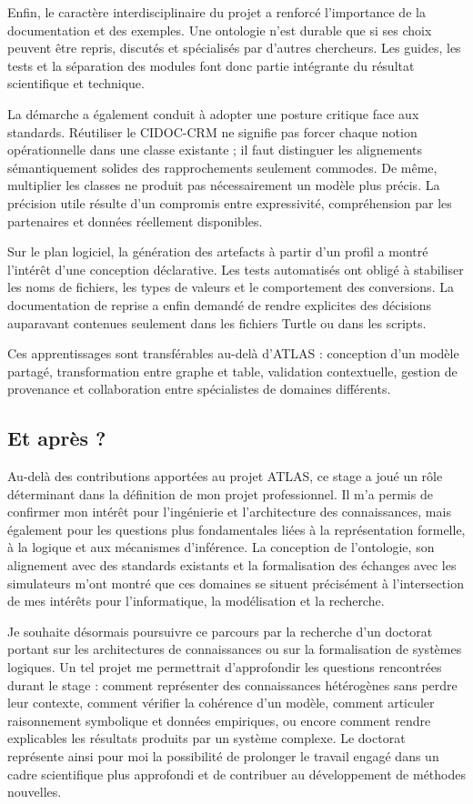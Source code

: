 \documentclass{article}
\begin{document}
Enfin, le caractère interdisciplinaire du projet a renforcé l'importance de la documentation et des exemples. Une ontologie n'est durable que si ses choix peuvent être repris, discutés et spécialisés par d'autres chercheurs. Les guides, les tests et la séparation des modules font donc partie intégrante du résultat scientifique et technique.

La démarche a également conduit à adopter une posture critique face aux standards. Réutiliser le CIDOC-CRM ne signifie pas forcer chaque notion opérationnelle dans une classe existante ; il faut distinguer les alignements sémantiquement solides des rapprochements seulement commodes. De même, multiplier les classes ne produit pas nécessairement un modèle plus précis. La précision utile résulte d'un compromis entre expressivité, compréhension par les partenaires et données réellement disponibles.

Sur le plan logiciel, la génération des artefacts à partir d'un profil a montré l'intérêt d'une conception déclarative. Les tests automatisés ont obligé à stabiliser les noms de fichiers, les types de valeurs et le comportement des conversions. La documentation de reprise a enfin demandé de rendre explicites des décisions auparavant contenues seulement dans les fichiers Turtle ou dans les scripts.

Ces apprentissages sont transférables au-delà d'ATLAS : conception d'un modèle partagé, transformation entre graphe et table, validation contextuelle, gestion de provenance et collaboration entre spécialistes de domaines différents.

\subsection{Et après ?}

Au-delà des contributions apportées au projet ATLAS, ce stage a joué un rôle déterminant dans la définition de mon projet professionnel. Il m'a permis de confirmer mon intérêt pour l'ingénierie et l'architecture des connaissances, mais également pour les questions plus fondamentales liées à la représentation formelle, à la logique et aux mécanismes d'inférence. La conception de l'ontologie, son alignement avec des standards existants et la formalisation des échanges avec les simulateurs m'ont montré que ces domaines se situent précisément à l'intersection de mes intérêts pour l'informatique, la modélisation et la recherche.

Je souhaite désormais poursuivre ce parcours par la recherche d'un doctorat portant sur les architectures de connaissances ou sur la formalisation de systèmes logiques. Un tel projet me permettrait d'approfondir les questions rencontrées durant le stage : comment représenter des connaissances hétérogènes sans perdre leur contexte, comment vérifier la cohérence d'un modèle, comment articuler raisonnement symbolique et données empiriques, ou encore comment rendre explicables les résultats produits par un système complexe. Le doctorat représente ainsi pour moi la possibilité de prolonger le travail engagé dans un cadre scientifique plus approfondi et de contribuer au développement de méthodes nouvelles.
\end{document}
